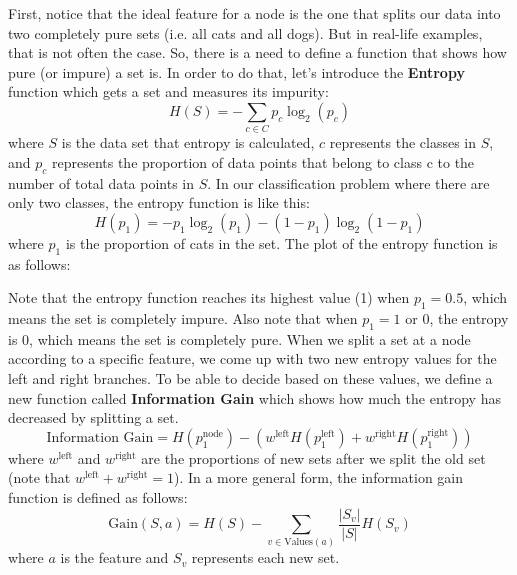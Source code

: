 \documentclass[a4paper, 12pt]{book}
\begin{document}
First, notice that the ideal feature for a node is the one that splits our data into two completely pure sets (i.e. all cats and all dogs). But in real-life examples, that is not often the case. So, there is a need to define a function that shows how pure (or impure) a set is. In order to do that, let's introduce the \textbf{Entropy} function which gets a set and measures its impurity: \[H(S) = -\sum_{c \in C} p_c \log_2(p_c)\] where $S$ is the data set that entropy is calculated, $c$ represents the classes in $S$, and $p_c$ represents the proportion of data points that belong to class c to the number of total data points in $S$. In our classification problem where there are only two classes, the entropy function is like this:
\[H(p_1) = -p_1 \log_2(p_1) - (1 - p_1) \log_2(1- p_1)\] where $p_1$ is the proportion of cats in the set. The plot of the entropy function is as follows:

\begin{center}
\end{center}

Note that the entropy function reaches its highest value (1) when $p_1 = 0.5$, which means the set is completely impure. Also note that when $p_1 = 1$ or $0$, the entropy is $0$, which means the set is completely pure. When we split a set at a node according to a specific feature, we come up with two new entropy values for the left and right branches. To be able to decide based on these values, we define a new function called \textbf{Information Gain} which shows how much the entropy has decreased by splitting a set. \[\text{Information Gain} = H(p_1^\text{node})- \left(w^{\text{left}}H(p_1^\text{left}) + w^{\text{right}}H(p_1^\text{right})\right)\] where $w^{\text{left}}$ and $w^{\text{right}}$ are the proportions of new sets after we split the old set (note that $w^{\text{left}} + w^{\text{right}} = 1$). In a more general form, the information gain function is defined as follows: \[\text{Gain}(S, a) = H(S) - \sum_{v \in \text{Values}(a)} \frac{|S_v|}{|S|}H(S_v)\] where $a$ is the feature and $S_v$ represents each new set.
\end{document}
